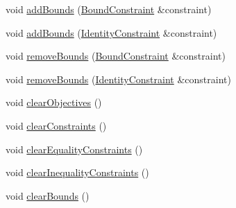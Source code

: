 {\bf }\par
\begin{DoxyCompactItemize}
\item 
void \hyperlink{classocra_1_1QuadraticSolver_ade074ba982ae752d2ee9f12329f89787}{add\+Bounds} (\hyperlink{namespaceocra_a6e55fff77635080219964abc301abf18}{Bound\+Constraint} \&constraint)
\item 
void \hyperlink{classocra_1_1QuadraticSolver_a4f58274f5f1d0eb6645b3e20bc09f090}{add\+Bounds} (\hyperlink{namespaceocra_a5fc023ff4ef8f4b0cdf410e088090731}{Identity\+Constraint} \&constraint)
\item 
void \hyperlink{classocra_1_1QuadraticSolver_aaa23af59a18bd6b2883199fd45a750c0}{remove\+Bounds} (\hyperlink{namespaceocra_a6e55fff77635080219964abc301abf18}{Bound\+Constraint} \&constraint)
\item 
void \hyperlink{classocra_1_1QuadraticSolver_ad3a761be1b05c23ab807effcdc710017}{remove\+Bounds} (\hyperlink{namespaceocra_a5fc023ff4ef8f4b0cdf410e088090731}{Identity\+Constraint} \&constraint)
\end{DoxyCompactItemize}

{\bf }\par
\begin{DoxyCompactItemize}
\item 
void \hyperlink{classocra_1_1QuadraticSolver_a0339ac8b860591dea7f24bc05d58fdf0}{clear\+Objectives} ()
\item 
void \hyperlink{classocra_1_1QuadraticSolver_a0799e2cf2d10be123e5dcdf43e1fcaba}{clear\+Constraints} ()
\item 
void \hyperlink{classocra_1_1QuadraticSolver_a5e9a6e51657e775ab6619e86814982cc}{clear\+Equality\+Constraints} ()
\item 
void \hyperlink{classocra_1_1QuadraticSolver_ac41ecf476cf2bbe6ce17e3520e44f138}{clear\+Inequality\+Constraints} ()
\item 
void \hyperlink{classocra_1_1QuadraticSolver_ab95c9570c859ca0d1ff2ea5f1c6efd44}{clear\+Bounds} ()
\end{DoxyCompactItemize}


